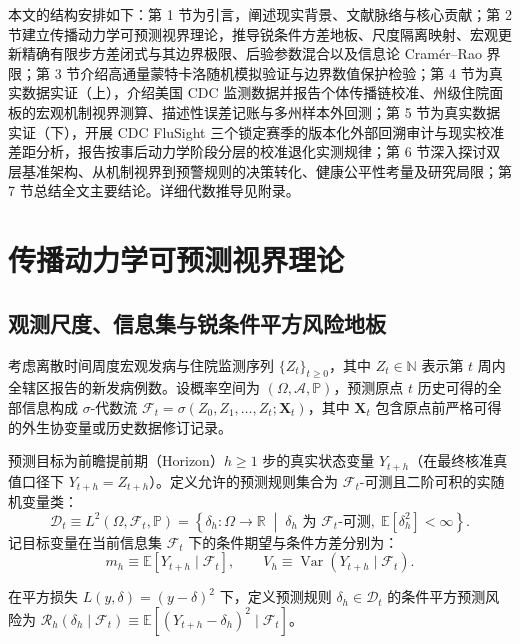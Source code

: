 \documentclass[11pt,a4paper]{article}
\theoremstyle{plain}
\theoremstyle{definition}
\begin{document}
本文的结构安排如下：第 1 节为引言，阐述现实背景、文献脉络与核心贡献；第 2 节建立传播动力学可预测视界理论，推导锐条件方差地板、尺度隔离映射、宏观更新精确有限步方差闭式与其边界极限、后验参数混合以及信息论 Cramér--Rao 界限；第 3 节介绍高通量蒙特卡洛随机模拟验证与边界数值保护检验；第 4 节为真实数据实证（上），介绍美国 CDC 监测数据并报告个体传播链校准、州级住院面板的宏观机制视界测算、描述性误差记账与多州样本外回测；第 5 节为真实数据实证（下），开展 CDC FluSight 三个锁定赛季的版本化外部回溯审计与现实校准差距分析，报告按事后动力学阶段分层的校准退化实测规律；第 6 节深入探讨双层基准架构、从机制视界到预警规则的决策转化、健康公平性考量及研究局限；第 7 节总结全文主要结论。详细代数推导见附录。

\section{传播动力学可预测视界理论}

\subsection{观测尺度、信息集与锐条件平方风险地板}\label{sec:risk_floor}

考虑离散时间周度宏观发病与住院监测序列 $\{Z_t\}_{t \ge 0}$，其中 $Z_t \in \mathbb{N}$ 表示第 $t$ 周内全辖区报告的新发病例数。设概率空间为 $(\Omega, \mathcal{A}, \mathbb{P})$，预测原点 $t$ 历史可得的全部信息构成 $\sigma$-代数流 $\mathcal{F}_t = \sigma(Z_0, Z_1, \dots, Z_t; \mathbf{X}_t)$，其中 $\mathbf{X}_t$ 包含原点前严格可得的外生协变量或历史数据修订记录。

预测目标为前瞻提前期（Horizon）$h \ge 1$ 步的真实状态变量 $Y_{t+h}$（在最终核准真值口径下 $Y_{t+h} = Z_{t+h}$）。定义允许的预测规则集合为 $\mathcal{F}_t$-可测且二阶可积的实随机变量类：
\begin{equation}
\mathcal{D}_t \equiv L^2(\Omega, \mathcal{F}_t, \mathbb{P}) = \left\{ \delta_h : \Omega \to \mathbb{R} \;\middle|\; \delta_h \text{ 为 } \mathcal{F}_t\text{-可测}, \; \mathbb{E}[\delta_h^2] < \infty \right\}.
\end{equation}
记目标变量在当前信息集 $\mathcal{F}_t$ 下的条件期望与条件方差分别为：
\begin{equation}
m_h \equiv \mathbb{E}[Y_{t+h} \mid \mathcal{F}_t], \qquad V_h \equiv \operatorname{Var}(Y_{t+h} \mid \mathcal{F}_t).
\end{equation}

在平方损失 $L(y, \delta) = (y - \delta)^2$ 下，定义预测规则 $\delta_h \in \mathcal{D}_t$ 的条件平方预测风险为 $\mathcal{R}_h(\delta_h \mid \mathcal{F}_t) \equiv \mathbb{E}[(Y_{t+h} - \delta_h)^2 \mid \mathcal{F}_t]$。
\end{document}
